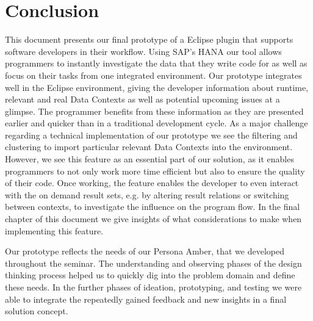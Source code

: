 
\section[Conclusion (Author: Patrick Schilf)]{Conclusion}
This document presents our final prototype of a Eclipse plugin that supports software developers in their workflow. Using SAP's HANA our tool allows programmers to instantly investigate the data that they write code for as well as focus on their tasks from one integrated environment. Our prototype integrates well in the Eclipse environment, giving the developer information about runtime, relevant and real Data Contexts as well as potential upcoming issues at a glimpse. The programmer benefits from these information as they are presented earlier and quicker than in a traditional development cycle. As a major challenge regarding a technical implementation of our prototype we see the filtering and clustering to import particular relevant Data Contexts into the environment. However, we see this feature as an essential part of our solution, as it enables programmers to not only work more time efficient but also to ensure the quality of their code. Once working, the feature enables the developer to even interact with the on demand result sets, e.g. by altering result relations or switching between contexts, to investigate the influence on the program flow. In the final chapter of this document we give insights of what considerations to make when implementing this feature.

Our prototype reflects the needs of our Persona Amber, that we developed throughout the seminar. The understanding and observing phases of the design thinking process helped us to quickly dig into the problem domain and define these needs. In the further phases of ideation, prototyping, and testing we were able to integrate the repeatedly gained feedback and new insights in a final solution concept.